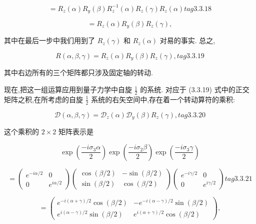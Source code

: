 $$
= {R}_{z}\left( \alpha \right) {R}_{y}\left( \beta \right) {R}_{z}^{-1}\left( \alpha \right) {R}_{z}\left( \gamma \right) {R}_{z}\left( \alpha \right) tag{3. 3.18}
$$

$$
= {R}_{z}\left( \alpha \right) {R}_{y}\left( \beta \right) {R}_{z}\left( \gamma \right) ,
$$

其中在最后一步中我们用到了 ${R}_{z}\left( \gamma \right)$ 和 ${R}_{z}\left( \alpha \right)$ 对易的事实. 总之,

$$
R\left( {\alpha ,\beta ,\gamma }\right) = {R}_{z}\left( \alpha \right) {R}_{y}\left( \beta \right) {R}_{z}\left( \gamma \right) , tag{3. 3.19}
$$

其中右边所有的三个矩阵都只涉及固定轴的转动.

现在,把这一组运算应用到量子力学中自旋 $\frac{1}{2}$ 的系统. 对应于 (3.3.19) 式中的正交矩阵之积,在所考虑的自旋 $\frac{1}{2}$ 系统的右矢空间中,存在着一个转动算符的乘积:

$$
\mathcal{D}\left( {\alpha ,\beta ,\gamma }\right) = {\mathcal{D}}_{z}\left( \alpha \right) {\mathcal{D}}_{y}\left( \beta \right) {R}_{z}\left( \gamma \right) , tag{3. 3.20}
$$

这个乘积的 $2 \times 2$ 矩阵表示是

$$
\exp \left( \frac{-i{\sigma }_{3}\alpha }{2}\right) \exp \left( \frac{-i{\sigma }_{2}\beta }{2}\right) \exp \left( \frac{-i{\sigma }_{3}\gamma }{2}\right)
$$

$$
= \left( \begin{matrix} {e}^{-{i\alpha }/2} & 0 \\ 0 & {e}^{{i\alpha }/2} \end{matrix}\right) \left( \begin{matrix} \cos \left( {\beta /2}\right) & - \sin \left( {\beta /2}\right) \\ \sin \left( {\beta /2}\right) & \cos \left( {\beta /2}\right) \end{matrix}\right) \left( \begin{matrix} {e}^{-{i\gamma }/2} & 0 \\ 0 & {e}^{{i\gamma }/2} \end{matrix}\right) tag{3. 3.21}
$$

$$
= \left( \begin{matrix} {e}^{-i\left( {\alpha + \gamma }\right) /2}\cos \left( {\beta /2}\right) & - {e}^{-i\left( {\alpha - \gamma }\right) /2}\sin \left( {\beta /2}\right) \\ {e}^{i\left( {\alpha - \gamma }\right) /2}\sin \left( {\beta /2}\right) & {e}^{i\left( {\alpha + \gamma }\right) /2}\cos \left( {\beta /2}\right) \end{matrix}\right) ,
$$

